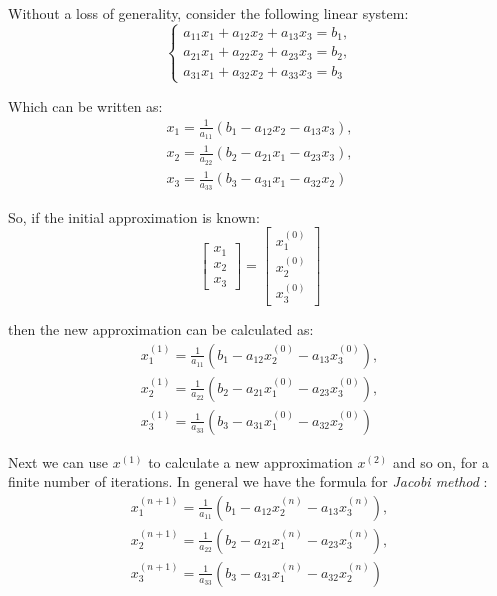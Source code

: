 \documentclass[letterpaper,12pt]{article}
\begin{document}
Without a loss of generality, consider the following linear system:
\begin{equation}
    \begin{cases}
        a_{11}x_1 + a_{12}x_2 + a_{13}x_3 = b_1,\\
        a_{21}x_1 + a_{22}x_2 + a_{23}x_3 = b_2,\\
        a_{31}x_1 + a_{32}x_2 + a_{33}x_3 = b_3
    \end{cases}
\end{equation}

Which can be written as:
\begin{equation}
    \begin{array}{cc}
        x_1 = \frac{1}{a_{11}}(b_1 - a_{12}x_2 - a_{13}x_3),\\
        x_2 = \frac{1}{a_{22}}(b_2 - a_{21}x_1 - a_{23}x_3),\\
        x_3 = \frac{1}{a_{33}}(b_3 - a_{31}x_1 - a_{32}x_2)
    \end{array}
\end{equation}

So, if the initial approximation is known:
\begin{equation}
    \begin{bmatrix}
        x_1\\
        x_2\\
        x_3
    \end{bmatrix}
    =
    \begin{bmatrix}
        x_1^{(0)}\\
        x_2^{(0)}\\
        x_3^{(0)}
    \end{bmatrix}
\end{equation}

then the new approximation can be calculated as:
\begin{equation}
    \begin{array}{cc}
        x_1^{(1)} = \frac{1}{a_{11}}(b_1 - a_{12}x_2^{(0)} - a_{13}x_3^{(0)}),\\
        x_2^{(1)} = \frac{1}{a_{22}}(b_2 - a_{21}x_1^{(0)} - a_{23}x_3^{(0)}),\\
        x_3^{(1)} = \frac{1}{a_{33}}(b_3 - a_{31}x_1^{(0)} - a_{32}x_2^{(0)})
    \end{array}
\end{equation}

Next we can use $x^{(1)}$ to calculate a new approximation $x^{(2)}$ and so on, for a finite number of iterations. In general we have the formula
for \textit{Jacobi method} \cite{jacobi}:
\begin{equation}
    \begin{array}{cc}
        x_1^{(n+1)} = \frac{1}{a_{11}}(b_1 - a_{12}x_2^{(n)} - a_{13}x_3^{(n)}),\\
        x_2^{(n+1)} = \frac{1}{a_{22}}(b_2 - a_{21}x_1^{(n)} - a_{23}x_3^{(n)}),\\
        x_3^{(n+1)} = \frac{1}{a_{33}}(b_3 - a_{31}x_1^{(n)} - a_{32}x_2^{(n)})\\
    \end{array}
\end{equation}
\end{document}
